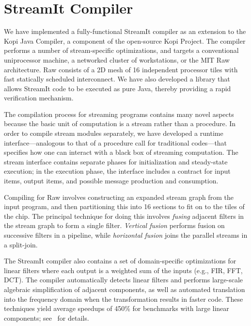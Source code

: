 \documentclass[final]{ijpp}
\begin{document}
\section{StreamIt Compiler}
\label{sec:compiler}

We  have  implemented  a  fully-functional  StreamIt  compiler  as  an
extension to  the Kopi Java  Compiler, a component of  the open-source
Kopi   Project\cite{kopi}.   The   compiler  performs   a   number  of
stream-specific optimizations, and targets a conventional uniprocessor
machine,  a  networked  cluster   of  workstations,  or  the  MIT  Raw
architecture.  Raw consists  of a 2D mesh of  16 independent processor
tiles with fast  statically scheduled interconnect\cite{rawshort}.  We
have also developed a library that allows StreamIt code to be executed
as pure Java, thereby providing a rapid verification mechanism.

The  compilation process  for streaming  programs contains  many novel
aspects because the basic unit  of computation is a stream rather than
a procedure.  In  order to compile stream modules  separately, we have
developed a runtime interface---analogous  to that of a procedure call
for  traditional codes---that specifies  how one  can interact  with a
black  box of  streaming computation.   The stream  interface contains
separate phases for initialization  and steady-state execution; in the
execution phase,  the interface includes  a contract for  input items,
output items, and possible message production and consumption.

Compiling for Raw involves  constructing an expanded stream graph from
the input program, and then  partitioning this into 16 sections to fit
on to  the tiles of the chip\cite{gordon02}.   The principal technique
for doing  this involves \emph{fusing} adjacent filters  in the stream
graph to form a single filter.  \emph{Vertical fusion} performs fusion
on successive  filters in  a pipeline, while  \emph{horizontal fusion}
joins the parallel streams in a split-join.

The  StreamIt   compiler  also  contains  a   set  of  domain-specific
optimizations for linear  filters where each output is  a weighted sum
of  the  inputs (e.g.,  FIR,  FFT,  DCT).  The compiler  automatically
detects   linear   filters    and   performs   large-scale   algebraic
simplification   of  adjacent   components,  as   well   as  automated
translation into the frequency  domain when the transformation results
in faster code.  These techniques  yield average speedups of 450\% for
benchmarks  with   large  linear  components;   see~\cite{lamb03}  for
details.
\end{document}
